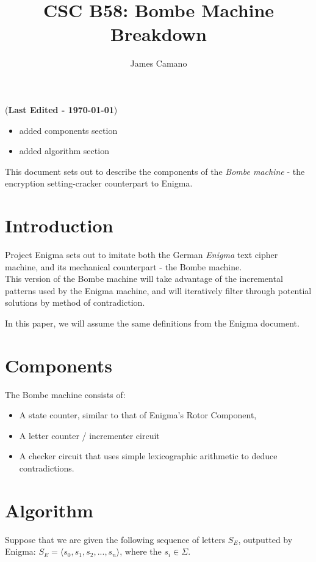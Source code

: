 \documentclass[12pt,a4paper,fleqn]{article}
\author{James Camano}
\title{CSC B58: Bombe Machine Breakdown}
\newcommand{\lastedited}{(\textbf{Last Edited - \today{}})}
\begin{document}
	\maketitle
	\lastedited
	\begin{itemize}
		\item added components section
		\item added algorithm section
	\end{itemize}		
	
	This document sets out to describe the components of the \emph{Bombe machine} - the encryption setting-cracker counterpart to Enigma.
	
	\section{Introduction}
	Project Enigma sets out to imitate both the German \emph{Enigma} text cipher machine, and its mechanical counterpart - the Bombe machine.  \\
	
	This version of the Bombe machine will take advantage of the incremental patterns used by the Enigma machine, and will iteratively filter through potential solutions by method of contradiction.
	
	
	In this paper, we will assume the same definitions from the Enigma document.
	\section{Components}
	
	The Bombe machine consists of:
	
	\begin{itemize}
		\item A state counter, similar to that of Enigma's Rotor Component,
		\item A letter counter / incrementer circuit
		\item A checker circuit that uses simple lexicographic arithmetic to deduce contradictions.
	\end{itemize}		
	
	\section{Algorithm}

	Suppose that we are given the following sequence of letters $S_E $, outputted by Enigma:
	$S_E = \langle s_0, s_1, s_2, ..., s_n \rangle$, where the $s_i \in \Sigma$.
	
\end{document}
